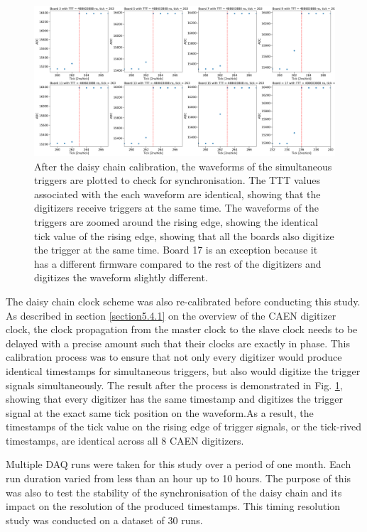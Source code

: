 \begin{figure}[htbp!] 
\centering    
\includegraphics[width=1.0\textwidth]{daisychain_calib}
\caption[daisychain_calib]{
After the daisy chain calibration, the waveforms of the simultaneous triggers are plotted to check for synchronisation.
The TTT values associated with the each waveform are identical, showing that the digitizers receive triggers at the same time.
The waveforms of the triggers are zoomed around the rising edge, showing the identical tick value of the rising edge, showing that all the boards also digitize the trigger at the same time.
Board 17 is an exception because it has a different firmware compared to the rest of the digitizers and digitizes the waveform slightly different.
}
\label{fig:daisychain_calib}
\end{figure}

The daisy chain clock scheme was also re-calibrated before conducting this study.
As described in section \ref{section5.4.1} on the overview of the CAEN digitizer clock, the clock propagation from the master clock to the slave clock needs to be delayed with a precise amount such that their clocks are exactly in phase.
This calibration process was to ensure that not only every digitizer would produce identical timestamps for simultaneous triggers, but also would digitize the trigger signals simultaneously.
The result after the process is demonstrated in Fig. \ref{fig:daisychain_calib}, showing that every digitizer has the same timestamp and digitizes the trigger signal at the exact same tick position on the waveform.As a result, the timestamps of the tick value on the rising edge of trigger signals, or the tick-rived timestamps, are identical across all 8 CAEN digitizers.

Multiple DAQ runs were taken for this study over a period of one month.
Each run duration varied from less than an hour up to 10 hours.
The purpose of this was also to test the stability of the synchronisation of the daisy chain and its impact on the resolution of the produced timestamps.
This timing resolution study was conducted on a dataset of 30 runs.

